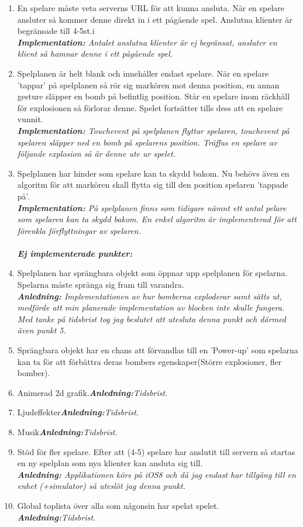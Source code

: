 \documentclass[10pt, titlepage, oneside, a4paper]{article}
\begin{document}
    	\begin{enumerate}
			\item En spelare måste veta serverns URL för att kunna ansluta. När en spelare ansluter så kommer denne direkt in i ett pågående spel. Anslutna klienter är begränsade till 4-5st.i\\\textit{\textbf{Implementation:} Antalet anslutna klienter är ej begränsat, ansluter en klient så hamnar denne i ett pågående spel.}
			
			\item Spelplanen är helt blank och innehåller endast spelare. När en spelare 'tappar' på spelplanen så rör sig markören mot denna position, en annan gesture släpper en bomb på befintlig position. Står en spelare inom räckhåll för explosionen så förlorar denne. Spelet fortsätter tills dess att en spelare vunnit.\\\textit{\textbf{Implementation:} Touchevent på spelplanen flyttar spelaren, touchevent på spelaren släpper ned en bomb på spelarens position. Träffas en spelare av följande explosion så är denne ute ur spelet.}
			
			
			\item Spelplanen har hinder som spelare kan ta skydd bakom. Nu behövs även en algoritm för att markören skall flytta sig till den position spelaren 'tappade på'.\\\textit{\textbf{Implementation:} På spelplanen finns som tidigare nämnt ett antal pelare som spelaren kan ta skydd bakom. En enkel algoritm är implementerad för att förenkla förflyttningar av spelaren.}
			\\\\\textit{\textbf{Ej implementerade punkter:}}
			\item Spelplanen har sprängbara objekt som öppnar upp spelplanen för spelarna. Spelarna måste spränga sig fram till varandra.\\\textit{\textbf{Anledning:} Implementationen av hur bomberna exploderar samt sätts ut, medförde att min planerade implementation av blocken inte skulle fungera. Med tanke på tidsbrist tog jag beslutet att utesluta denna punkt och därmed även punkt 5.}
			\item Sprängbara objekt har en chans att förvandlas till en 'Power-up' som spelarna kan ta för att förbättra deras bombers egenskaper(Större explosioner, fler bomber).
			\item Animerad 2d grafik.\textit{\textbf{Anledning:}Tidsbrist.}
			\item Ljudeffekter\textit{\textbf{Anledning:}Tidsbrist.}
			\item Musik\textit{\textbf{Anledning:}Tidsbrist.}
			\item Stöd för fler spelare. Efter att (4-5) spelare har anslutit till servern så startas en ny spelplan som nya klienter kan ansluta sig till.\\\textit{\textbf{Anledning:} Applikationen körs på iOS8 och då jag endast har tillgång till en enhet (+simulator) så uteslöt jag denna punkt.}
			\item Global toplista över alla som någonsin har spelat spelet.\\\textit{\textbf{Anledning:}Tidsbrist.}
		\end{enumerate}
\end{document}
